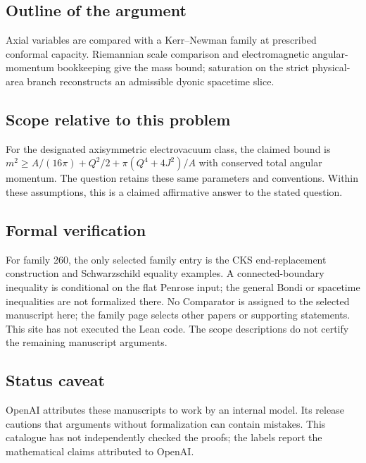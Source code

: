 \documentclass[11pt]{article}
\begin{document}
\subsection{Outline of the argument}
Axial variables are compared with a Kerr--Newman family at prescribed conformal capacity. Riemannian scale comparison and electromagnetic angular-momentum bookkeeping give the mass bound; saturation on the strict physical-area branch reconstructs an admissible dyonic spacetime slice.

\subsection{Scope relative to this problem}
For the designated axisymmetric electrovacuum class, the claimed bound is $m^2\geq A/(16\pi)+Q^2/2+\pi(Q^4+4J^2)/A$ with conserved total angular momentum. The question retains these same parameters and conventions. Within these assumptions, this is a claimed affirmative answer to the stated question.

\subsection{Formal verification}
For family 260, the only selected family entry is the CKS end-replacement construction and Schwarzschild equality examples. A connected-boundary inequality is conditional on the flat Penrose input; the general Bondi or spacetime inequalities are not formalized there. No Comparator is assigned to the selected manuscript here; the family page selects other papers or supporting statements. This site has not executed the Lean code. The scope descriptions do not certify the remaining manuscript arguments.

\subsection{Status caveat}
OpenAI attributes these manuscripts to work by an internal model. Its release cautions that arguments without formalization can contain mistakes. This catalogue has not independently checked the proofs; the labels report the mathematical claims attributed to OpenAI.
\end{document}
